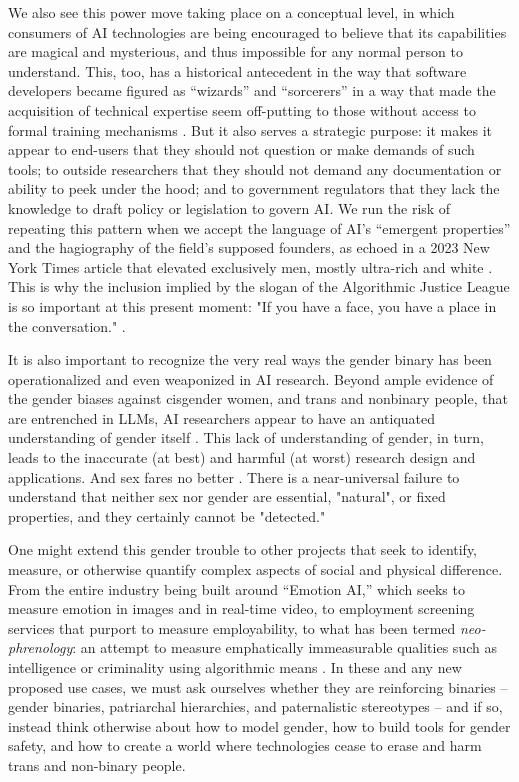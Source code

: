 We also see this power move taking place on a conceptual level, in which consumers of AI technologies are being encouraged to believe that its capabilities are magical and mysterious, and thus impossible for any normal person to understand. 
This, too, has a historical antecedent in the way that software developers became figured as “wizards” and “sorcerers” in a way that made the acquisition of technical expertise seem off-putting to those without access to formal training mechanisms \cite{Ensmenger_2012, Hicks_2018}.
But it also serves a strategic purpose: it makes it appear to end-users that they should not question or make demands of such tools; to outside researchers that they should not demand any documentation or ability to peek under the hood; and to government regulators that they lack the knowledge to draft policy or legislation to govern AI. We run the risk of repeating this pattern when we accept the language of AI’s “emergent properties” and the hagiography of the field’s supposed founders, as echoed in a 2023 New York Times article that elevated exclusively men, mostly ultra-rich and white \cite{Kim_2023}. 
This is why the inclusion implied by the slogan of the Algorithmic Justice League is so important at this present moment: "If you have a face, you have a place in the conversation." \cite{Algorithmic_Justice_League}.  

It is also important to recognize the very real ways the gender binary has been operationalized and even weaponized in AI research. Beyond ample evidence of the gender biases against cisgender women, and trans and nonbinary people, that are entrenched in LLMs, AI researchers appear to have an antiquated understanding of gender itself \cite{Keyes_2018, Devinney_Björklund_Björklund_2022, Stanczak_Augenstein_2021, Scheuerman_Paul_Brubaker_2019}. This lack of understanding of gender, in turn, leads to the inaccurate (at best) and harmful (at worst) research design and applications. And sex fares no better
\cite{Albert_Delano_2022}. There is a near-universal failure to understand that neither sex nor gender are essential, "natural", or fixed properties, and they certainly cannot be "detected." 

One might extend this gender trouble to other projects that seek to identify, measure, or otherwise quantify complex aspects of social and physical difference. From the entire industry being built around “Emotion AI,” which seeks to measure emotion in images and in real-time video, to employment screening services that purport to measure employability, to what has been termed \textit{neo-phrenology}: an attempt to measure emphatically immeasurable qualities such as intelligence or criminality using algorithmic means \cite{Dark_Past_2020}. 
In these and any new proposed use cases, we must ask ourselves whether they are reinforcing binaries – gender binaries, patriarchal hierarchies, and paternalistic stereotypes – and if so, instead think otherwise about how to model gender, how to build tools for gender safety, and how to create a world where technologies cease to erase and harm trans and non-binary people. 

